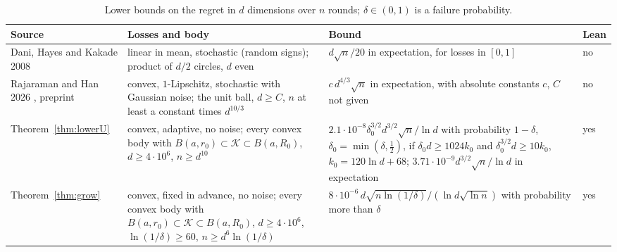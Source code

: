 \documentclass[11pt]{amsart}
\newcommand{\rowsep}{\arrayrulecolor{black!30}\specialrule{0.4pt}{2pt}{2pt}\arrayrulecolor{black}}
\theoremstyle{definition}
\numberwithin{equation}{section}
\newcommand{\cK}{\mathcal{K}}
\begin{document}
\begin{table}[ht]
\centering\small
\caption{Lower bounds on the regret in $d$ dimensions over $n$ rounds; $\delta\in(0,1)$ is a failure probability.}\label{tab:lower}
\begin{tabular}{@{}>{\raggedright\arraybackslash}p{}>{\raggedright\arraybackslash}p{}>{\raggedright\arraybackslash}p{}l@{}}
\toprule
Source & Losses and body & Bound & Lean\\
\midrule
Dani, Hayes and Kakade 2008 \cite[Theorem~3]{DHK08} & linear in mean, stochastic (random signs); product of $d/2$ circles, $d$ even & $d\sqrt n/20$ in expectation, for losses in $[0,1]$ & no\\\rowsep
Rajaraman and Han 2026 \cite[Theorem~1.2]{RH26}, preprint & convex, $1$-Lipschitz, stochastic with Gaussian noise; the unit ball, $d\ge C$, $n$ at least a constant times $d^{10/3}$ & $c\,d^{4/3}\sqrt n$ in expectation, with absolute constants $c$, $C$ not given & no\\\rowsep
Theorem~\ref{thm:lowerU} & convex, adaptive, no noise; every convex body with $B(a,r_0)\subset\cK\subset B(a,R_0)$, $d\ge4\cdot10^6$, $n\ge d^{10}$ & $2.1\cdot10^{-8}\delta_0^{3/2}d^{3/2}\sqrt n/\ln d$ with probability $1-\delta$, $\delta_0=\min(\delta,\frac12)$, if $\delta_0d\ge1024k_0$ and $\delta_0^{3/2}d\ge10k_0$, $k_0=120\ln d+68$; $3.71\cdot10^{-9}d^{3/2}\sqrt n/\ln d$ in expectation & yes\\\rowsep
Theorem~\ref{thm:grow} & convex, fixed in advance, no noise; every convex body with $B(a,r_0)\subset\cK\subset B(a,R_0)$, $d\ge4\cdot10^6$, $\ln(1/\delta)\ge60$, $n\ge d^6\ln(1/\delta)$ & $8\cdot10^{-6}\,d\sqrt{n\ln(1/\delta)}/(\ln d\sqrt{\ln n})$ with probability more than $\delta$ & yes\\
\bottomrule
\end{tabular}
\end{table}
\end{document}
